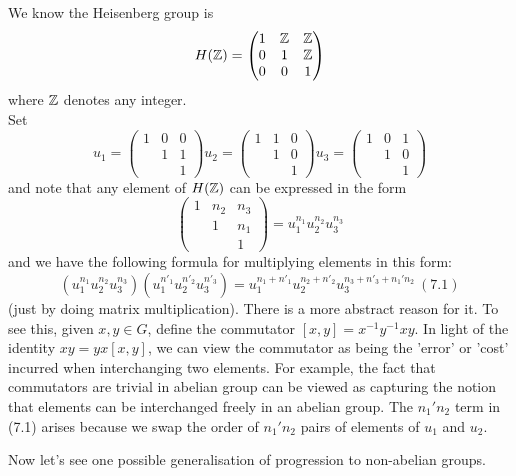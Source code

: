 \documentclass[a4paper]{article}
\begin{document}
We know the Heisenberg group is
\[
H(\mathbb{Z}) = \begin{pmatrix}
1 & \mathbb{Z} & \mathbb{Z}\\
0 & 1 & \mathbb{Z}\\
0 & 0 & 1
\end{pmatrix}
\]
where $\mathbb{Z}$ denotes any integer.\\
Set 
\[
u_1 = \begin{pmatrix}
1&0&0\\
&1&1\\
&&1
\end{pmatrix}
u_2 = \begin{pmatrix}
1&1&0\\
&1&0\\
&&1
\end{pmatrix}
u_3 = \begin{pmatrix}
1&0&1\\
&1&0\\
&&1
\end{pmatrix}
\]
and note that any element of $H(\mathbb{Z})$ can be expressed in the form
\[
\begin{pmatrix}
1&n_2&n_3\\
&1&n_1\\
&&1
\end{pmatrix}
= u_1^{n_1}u_2^{n_2}u_3^{n_3}
\]
and we have the following formula for multiplying elements in this form:
\[
(u_1^{n_1}u_2^{n_2}u_3^{n_3})(u_1^{n'_1}u_2^{n'_2}u_3^{n'_3}) = u_1^{n_1+n'_1}u_2^{n_2+n'_2}u_3^{n_3+n'_3+n_1'n_2} \ (7.1)
\]
(just by doing matrix multiplication). There is a more abstract reason for it. To see this, given $x,y \in G$, define the commutator $[x,y] = x^{-1}y^{-1}xy$. In light of the identity $xy = yx[x,y]$, we can view the commutator as being the 'error' or 'cost' incurred when interchanging two elements. For example, the fact that commutators are trivial in abelian group can be viewed as capturing the notion that elements can be interchanged freely in an abelian group. The $n_1'n_2$ term in (7.1) arises because we swap the order of $n_1'n_2$ pairs of elements of $u_1$ and $u_2$.

Now let's see one possible generalisation of progression to non-abelian groups.
\end{document}
